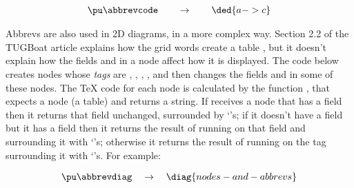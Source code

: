\documentclass[oneside]{article}
\def\cded #1{\begin{matrix}\ded {#1}\end{matrix}}
\begin{document}

$$\pu
  \myvcenter{\abbrevcode}
  \qquad
  \to
  \qquad
  \cded{a->c}
$$


Abbrevs are also used in 2D diagrams, in a more complex way. Section
2.2 of the TUGBoat article explains how the grid words create a table
, but it doesn't explain how the fields  and
 in a node affect how it is displayed. The code below creates
nodes whose {\sl tags} are , , , , and
then changes the fields  and  in some of these
nodes. The \TeX{} code for each node is calculated by the function
, that expects a node (a table) and returns a
string. If  receives a node that has a 
field then it returns that field unchanged, surrounded by
`\co{\{\}}'s; if it doesn't have a  field but it has a
 field then it returns the result of running  on
that field and surrounding it with `\co{\{\}}'s; otherwise it returns
the result of running  on the tag surrounding it with
`\co{\{\}}'s. For example:


$$\pu
  \myvcenter{\abbrevdiag}
  \quad
  \to
  \quad
  \diag{nodes-and-abbrevs}
$$
\end{document}

